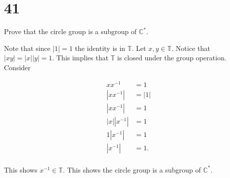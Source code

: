 \documentclass[a4paper]{article}
\begin{document}
\section*{41}

Prove that the circle group is a subgroup of $\mathbb{C}^*$.

\vspace{\baselineskip}

Note that since $|1| = 1$ the identity is in $\mathbb{T}$. Let $x,y \in \mathbb{T}$. Notice that $|xy| = |x||y| = 1$. This implies that $\mathbb{T}$ is closed under the group operation. Consider 

\begin{align*}
x x^{-1} &= 1 \\
|x x ^{-1}| &= |1| \\
|x x ^{-1}| &= 1 \\
|x| |x ^{-1}| &= 1 \\
1 | x ^{-1}| &= 1 \\
|x ^{-1}| &= 1 .\\
\end{align*}

This shows $x^{-1} \in \mathbb{T}$. This shows the circle group is a subgroup of $\mathbb{C}^*$.
\end{document}
